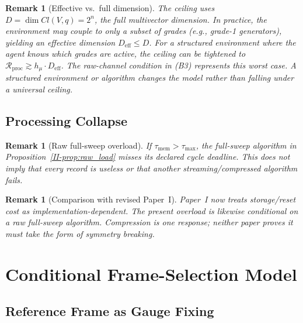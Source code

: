 \documentclass[12pt,a4paper,openany]{book}
\newtheorem{remark}[theorem]{Remark}
\begin{document}
\begin{remark}[Effective vs.\ full dimension]
\label{II-rem:D_eff}
The ceiling uses $D = \dim Cl(V,q) = 2^n$, the full
multivector dimension.
In practice, the environment may couple to only a subset of
grades (e.g., grade-1 generators), yielding an effective
dimension $D_{\mathrm{eff}} \leq D$.
For a \emph{structured} environment where the agent knows
which grades are active, the ceiling can be tightened to
$\mathcal{R}_{\mathrm{proc}} \gtrsim h_\mu
\cdot D_{\mathrm{eff}}$.
The raw-channel condition in (B3) represents this worst case.  A
structured environment or algorithm changes the model rather than
falling under a universal ceiling.
\end{remark}

\subsection{Processing Collapse}
\label{II-subsec:collapse}

\begin{remark}[Raw full-sweep overload]
\label{II-rem:raw_overload}
If $\tau_{\mathrm{mem}}>\tau_{\max}$, the full-sweep algorithm in
Proposition~\ref{II-prop:raw_load} misses its declared cycle deadline.
This does not imply that every record is useless or that another
streaming/compressed algorithm fails.
\end{remark}

\begin{remark}[Comparison with revised Paper~I]
\label{II-rem:comparison}
Paper~I now treats storage/reset cost as implementation-dependent.  The
present overload is likewise conditional on a raw full-sweep algorithm.
Compression is one response; neither paper proves it must take the form
of symmetry breaking.
\end{remark}

\section{Conditional Frame-Selection Model}
\label{II-sec:breaking}

\subsection{Reference Frame as Gauge Fixing}
\label{II-subsec:frame}
\end{document}
